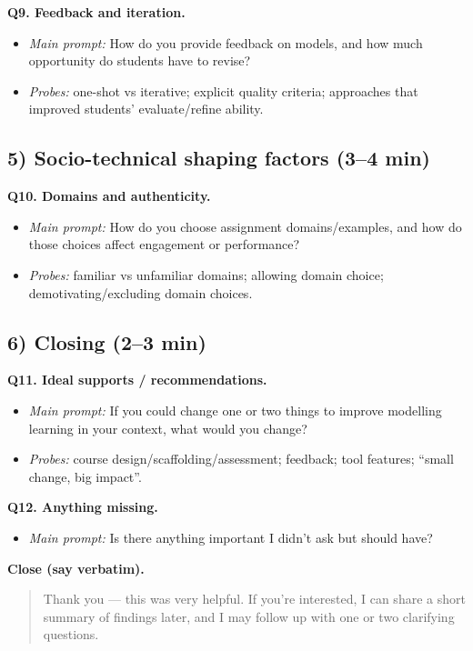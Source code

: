 \textbf{Q9. Feedback and iteration.}
\begin{itemize}
  \item \emph{Main prompt:} How do you provide feedback on models, and how much opportunity do students have to revise?
  \item \emph{Probes:} one-shot vs iterative; explicit quality criteria; approaches that improved students’ evaluate/refine ability.
\end{itemize}

\subsection*{5) Socio-technical shaping factors (3--4 min)}
\textbf{Q10. Domains and authenticity.}
\begin{itemize}
  \item \emph{Main prompt:} How do you choose assignment domains/examples, and how do those choices affect engagement or performance?
  \item \emph{Probes:} familiar vs unfamiliar domains; allowing domain choice; demotivating/excluding domain choices.
\end{itemize}

\subsection*{6) Closing (2--3 min)}
\textbf{Q11. Ideal supports / recommendations.}
\begin{itemize}
  \item \emph{Main prompt:} If you could change one or two things to improve modelling learning in your context, what would you change?
  \item \emph{Probes:} course design/scaffolding/assessment; feedback; tool features; “small change, big impact”.
\end{itemize}

\textbf{Q12. Anything missing.}
\begin{itemize}
  \item \emph{Main prompt:} Is there anything important I didn’t ask but should have?
\end{itemize}

\bigskip
\noindent\textbf{Close (say verbatim).}
\begin{quote}
Thank you — this was very helpful. If you’re interested, I can share a short summary of findings later, and I may follow up with one or two clarifying questions.
\end{quote}

